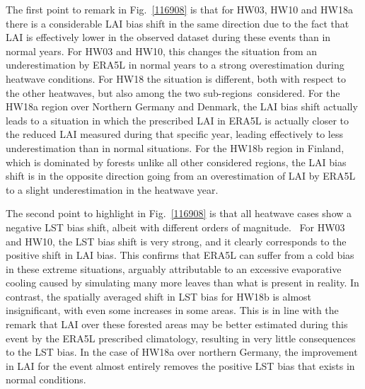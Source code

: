 \documentclass[gmd, manuscript]{copernicus}
\begin{document}
{The first point to remark in Fig.~{\ref{116908}} is
that for HW03, HW10 and HW18a~ there is a considerable LAI bias shift in
the same direction due to the fact that LAI is effectively lower in the
observed dataset during these events than in normal years. For HW03 and
HW10, this changes the situation from an underestimation by ERA5L in
normal years to a strong overestimation during heatwave conditions. For
HW18 the situation is different, both with respect to the other
heatwaves, but also among the two sub-regions~considered. For the HW18a
region over Northern Germany and Denmark, the LAI bias shift actually
leads to a situation in which the prescribed LAI in ERA5L is actually
closer to the reduced LAI measured during that specific year, leading
effectively to less underestimation than in normal situations. For the
HW18b region in Finland, which is dominated by forests unlike all other
considered regions, the LAI bias shift is in the opposite direction
going from an overestimation of LAI by ERA5L to a slight underestimation
in the heatwave year.

The second point to highlight in Fig.~{\ref{116908}} is
that all heatwave cases show a negative LST bias shift, albeit with
different orders of magnitude.~ For HW03 and HW10, the LST bias shift is
very strong, and it clearly corresponds to the positive shift in LAI
bias. This confirms that ERA5L can suffer from a cold bias in these
extreme situations, arguably attributable to an excessive evaporative
cooling caused by simulating many more leaves than what is present in
reality. In contrast, the spatially averaged shift in LST bias for HW18b
is almost insignificant, with even some increases in some areas. This is
in line with the remark that LAI over these forested areas may be better
estimated during this event by the ERA5L prescribed climatology,
resulting in very little consequences to the LST bias. In the case of
HW18a over northern Germany, the improvement in LAI for the event almost
entirely removes the positive LST bias that exists in normal conditions.

}
\end{document}
